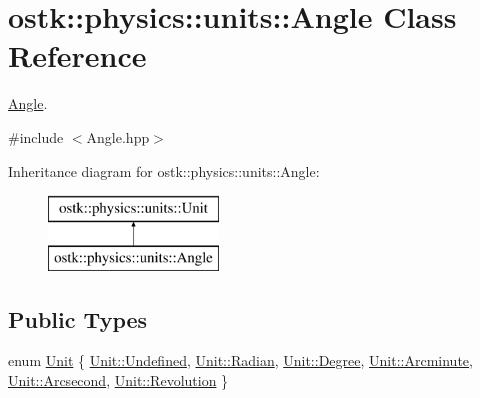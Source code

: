 \hypertarget{classostk_1_1physics_1_1units_1_1_angle}{}\section{ostk\+:\+:physics\+:\+:units\+:\+:Angle Class Reference}
\label{classostk_1_1physics_1_1units_1_1_angle}


\hyperlink{classostk_1_1physics_1_1units_1_1_angle}{Angle}.  




{\ttfamily \#include $<$Angle.\+hpp$>$}

Inheritance diagram for ostk\+:\+:physics\+:\+:units\+:\+:Angle\+:\begin{figure}[H]
\begin{center}
\leavevmode
\includegraphics[height=2.000000cm]{classostk_1_1physics_1_1units_1_1_angle}
\end{center}
\end{figure}
\subsection*{Public Types}
\begin{DoxyCompactItemize}
\item 
enum \hyperlink{classostk_1_1physics_1_1units_1_1_angle_aea1f8018b1d378b9dee56959d8eb9def}{Unit} \{ \newline
\hyperlink{classostk_1_1physics_1_1units_1_1_angle_aea1f8018b1d378b9dee56959d8eb9defaec0fc0100c4fc1ce4eea230c3dc10360}{Unit\+::\+Undefined}, 
\hyperlink{classostk_1_1physics_1_1units_1_1_angle_aea1f8018b1d378b9dee56959d8eb9defa50c62e3ca8d8ec8732a7f968a3bf2c7c}{Unit\+::\+Radian}, 
\hyperlink{classostk_1_1physics_1_1units_1_1_angle_aea1f8018b1d378b9dee56959d8eb9defa6669c4dc00cb161446821b3529ca07d8}{Unit\+::\+Degree}, 
\hyperlink{classostk_1_1physics_1_1units_1_1_angle_aea1f8018b1d378b9dee56959d8eb9defa6d59f6ca1b5de72cbdc10a6792bcf090}{Unit\+::\+Arcminute}, 
\newline
\hyperlink{classostk_1_1physics_1_1units_1_1_angle_aea1f8018b1d378b9dee56959d8eb9defa7839ceecae19481f2e21e0ce3e11d3aa}{Unit\+::\+Arcsecond}, 
\hyperlink{classostk_1_1physics_1_1units_1_1_angle_aea1f8018b1d378b9dee56959d8eb9defaad09b2d48b2811c68e5a2bf421f7f2f2}{Unit\+::\+Revolution}
 \}
\end{DoxyCompactItemize}
